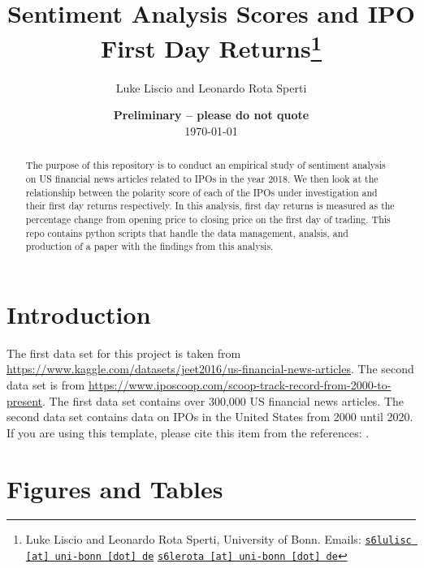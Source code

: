 \documentclass[11pt, a4paper, leqno]{article}
\begin{document}
\title{Sentiment Analysis Scores and IPO First Day Returns\thanks{Luke Liscio and Leonardo Rota Sperti, University of Bonn. Emails: \href{mailto:s6lulisc@uni-bonn.de}{\nolinkurl{s6lulisc [at] uni-bonn [dot] de}} \href{mailto:s6lerota@uni-bonn.de}{\nolinkurl{s6lerota [at] uni-bonn [dot] de}}}}

\author{Luke Liscio and Leonardo Rota Sperti}

\date{
    {\bf Preliminary -- please do not quote}
    \\[1ex]
    \today
}

\maketitle


\begin{abstract}
    The purpose of this repository is to conduct an empirical study of sentiment analysis on
US financial news articles related to IPOs in the year 2018. We then look at the
relationship between the polarity score of each of the IPOs under investigation and
their first day returns respectively. In this analysis, first day returns is measured as
the percentage change from opening price to closing price on the first day of trading.
This repo contains python scripts that handle the data management, analsis, and
production of a paper with the findings from this analysis.
\end{abstract}

\clearpage


\section{Introduction} %
\label{sec:introduction}

The first data set for this project is taken from
\url{https://www.kaggle.com/datasets/jeet2016/us-financial-news-articles}.
The second data set is from
\url{https://www.iposcoop.com/scoop-track-record-from-2000-to-present}.
The first data set contains over 300,000 US financial news articles.
The second data set contains data on IPOs in the United States from 2000 until 2020.
If you are using this template, please cite this item from the references:
\citet{GaudeckerEconProjectTemplates}.

\section{Figures and Tables}
\label{sec:Figures and Tables}
\end{document}
